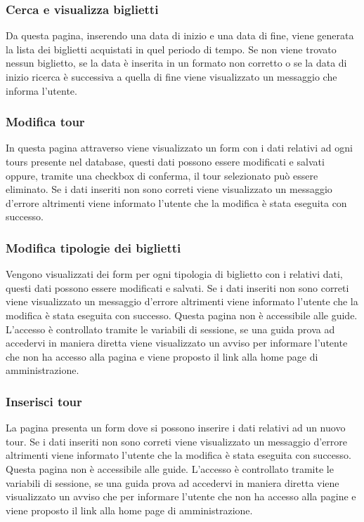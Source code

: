 \documentclass[10pt,a4paper,onecolumn]{article}
\begin{document}
\subsubsection{Cerca e visualizza biglietti}
Da questa pagina, inserendo una data di inizio e una data di fine, viene generata la lista dei biglietti acquistati in quel periodo di tempo. Se non viene trovato nessun biglietto, se la data è inserita in un formato non corretto o se la data di inizio ricerca è successiva a quella di fine viene visualizzato un messaggio che informa l'utente.

\subsubsection{Modifica tour}
In questa pagina attraverso viene visualizzato un form con i dati relativi ad ogni tours presente nel database, questi dati possono essere modificati e salvati oppure, tramite una checkbox di conferma, il tour selezionato può essere eliminato. Se i dati inseriti non sono correti viene visualizzato un messaggio d'errore altrimenti viene informato l'utente che la modifica è stata eseguita con successo.

\subsubsection{Modifica tipologie dei biglietti}
Vengono visualizzati dei form per ogni tipologia di biglietto con i relativi dati, questi dati possono essere modificati e salvati. Se i dati inseriti non sono correti viene visualizzato un messaggio d'errore altrimenti viene informato l'utente che la modifica è stata eseguita con successo.
Questa pagina non è accessibile alle guide. L'accesso è controllato tramite le variabili di sessione, se una guida prova ad accedervi in maniera diretta viene visualizzato un avviso per informare l'utente che non ha accesso alla pagina e viene proposto il link alla home page di amministrazione.

\subsubsection{Inserisci tour}
La pagina presenta un form dove si possono inserire i dati relativi ad un nuovo tour. Se i dati inseriti non sono correti viene visualizzato un messaggio d'errore altrimenti viene informato l'utente che la modifica è stata eseguita con successo.
Questa pagina non è accessibile alle guide. L'accesso è controllato tramite le variabili di sessione, se una guida prova ad accedervi in maniera diretta viene visualizzato un avviso che per informare l'utente che non ha accesso alla pagine e viene proposto il link alla home page di amministrazione.
\end{document}
